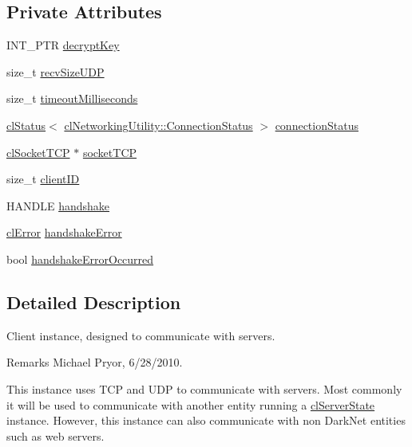 \subsection*{Private Attributes}
\begin{DoxyCompactItemize}
\item 
INT\_\-PTR \hyperlink{classcl_client_state_ab8feb66a89295b2ee744245aad8e86ba}{decryptKey}
\item 
size\_\-t \hyperlink{classcl_client_state_a3aaf9947d4f362c07cacc6f5ea89ba82}{recvSizeUDP}
\item 
size\_\-t \hyperlink{classcl_client_state_aad6e8fb3e4c918cdd7596a1e5b7e8e5b}{timeoutMilliseconds}
\item 
\hyperlink{classcl_status}{clStatus}$<$ \hyperlink{classcl_networking_utility_a15dd34683154e07d5843f8f5432fec6d}{clNetworkingUtility::ConnectionStatus} $>$ \hyperlink{classcl_client_state_a97b10049b464fb11544d22bdb03ada4f}{connectionStatus}
\item 
\hyperlink{classcl_socket_t_c_p}{clSocketTCP} $\ast$ \hyperlink{classcl_client_state_ac58716d4f5c67f88577540d0272f0804}{socketTCP}
\item 
size\_\-t \hyperlink{classcl_client_state_a4153db8a239f862cbd61bf8e75e25794}{clientID}
\item 
HANDLE \hyperlink{classcl_client_state_a8a137584141df71f35ef6af70d1ec365}{handshake}
\item 
\hyperlink{structcl_error}{clError} \hyperlink{classcl_client_state_ad6d910b86977c982fe7d60689289fada}{handshakeError}
\item 
bool \hyperlink{classcl_client_state_a5d655bd30abb4dc85baf932cafec8d41}{handshakeErrorOccurred}
\end{DoxyCompactItemize}


\subsection{Detailed Description}
Client instance, designed to communicate with servers. \begin{DoxyRemark}{Remarks}
Michael Pryor, 6/28/2010.
\end{DoxyRemark}
This instance uses TCP and UDP to communicate with servers. Most commonly it will be used to communicate with another entity running a \hyperlink{classcl_server_state}{clServerState} instance. However, this instance can also communicate with non DarkNet entities such as web servers. 

